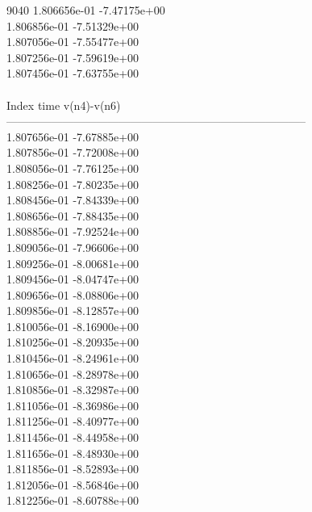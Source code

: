 9040	1.806656e-01	-7.47175e+00	\\ 	1.806856e-01	-7.51329e+00	\\ 	1.807056e-01	-7.55477e+00	\\ 	1.807256e-01	-7.59619e+00	\\ 	1.807456e-01	-7.63755e+00	\\ \hline
\\ \hline
Index   time            v(n4)-v(n6)     \\ \hline
--------------------------------------------------------------------------------\\ 	1.807656e-01	-7.67885e+00	\\ 	1.807856e-01	-7.72008e+00	\\ 	1.808056e-01	-7.76125e+00	\\ 	1.808256e-01	-7.80235e+00	\\ 	1.808456e-01	-7.84339e+00	\\ 	1.808656e-01	-7.88435e+00	\\ 	1.808856e-01	-7.92524e+00	\\ 	1.809056e-01	-7.96606e+00	\\ 	1.809256e-01	-8.00681e+00	\\ 	1.809456e-01	-8.04747e+00	\\ 	1.809656e-01	-8.08806e+00	\\ 	1.809856e-01	-8.12857e+00	\\ 	1.810056e-01	-8.16900e+00	\\ 	1.810256e-01	-8.20935e+00	\\ 	1.810456e-01	-8.24961e+00	\\ 	1.810656e-01	-8.28978e+00	\\ 	1.810856e-01	-8.32987e+00	\\ 	1.811056e-01	-8.36986e+00	\\ 	1.811256e-01	-8.40977e+00	\\ 	1.811456e-01	-8.44958e+00	\\ 	1.811656e-01	-8.48930e+00	\\ 	1.811856e-01	-8.52893e+00	\\ 	1.812056e-01	-8.56846e+00	\\ 	1.812256e-01	-8.60788e+00	\\ \hline
